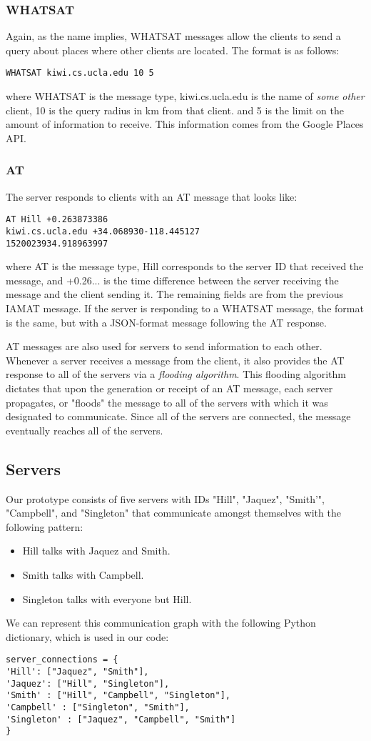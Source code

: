 \subsubsection{WHATSAT}
Again, as the name implies, WHATSAT messages allow the clients to send a query about places where other clients are located.
The format is as follows: 
\begin{verbatim}
WHATSAT kiwi.cs.ucla.edu 10 5
\end{verbatim}
where WHATSAT is the message type, kiwi.cs.ucla.edu is the name of \emph{some other} client, 10 is the query 
radius in km from that client. and 5 is the limit on the amount of information to receive. This information comes
from the Google Places API. 
\subsubsection{AT}
The server responds to clients with an AT message that looks like:
\begin{verbatim}
AT Hill +0.263873386 
kiwi.cs.ucla.edu +34.068930-118.445127 
1520023934.918963997
\end{verbatim}
where AT is the message type, Hill corresponds to the server ID that received the message, and  
+0.26... is the time difference between the server receiving the message and the client sending it. 
The remaining fields are from the previous IAMAT message. If the server is responding to a 
WHATSAT message, the format is the same, but with a JSON-format message following the AT response. 

AT messages are also used for servers 
to send information to each other. Whenever a server receives a message from the client, it also provides the AT response
to all of the servers via a \emph{flooding algorithm}. This flooding algorithm dictates that upon the generation or receipt of an AT message, 
each server propagates, or "floods" the message to all of the servers with which it was designated to communicate. Since all of the servers 
are connected, the message eventually reaches all of the servers. 
\subsection{Servers}
Our prototype consists of five servers with  IDs "Hill", "Jaquez", "Smith'", "Campbell", and "Singleton" that communicate
amongst themselves with the following pattern:
\begin{itemize}
\item Hill talks with Jaquez and Smith.
\item Smith talks with Campbell.
\item Singleton talks with everyone but Hill.
\end{itemize}
We can represent this communication graph with the following Python dictionary, which is used in our code:
\begin{verbatim}
server_connections = {
'Hill': ["Jaquez", "Smith"],
'Jaquez': ["Hill", "Singleton"],
'Smith' : ["Hill", "Campbell", "Singleton"],
'Campbell' : ["Singleton", "Smith"],
'Singleton' : ["Jaquez", "Campbell", "Smith"]
}
\end{verbatim}
